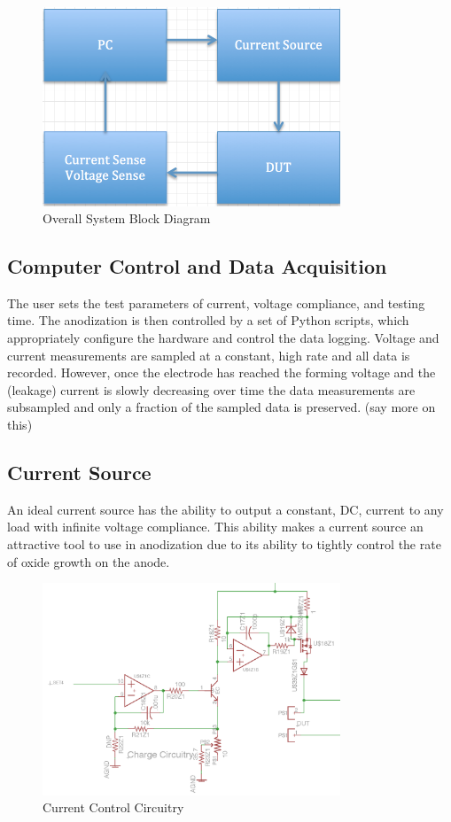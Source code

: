 \documentclass[journal]{IEEEtran}
\begin{document}
\begin{figure}[here]
\centering
\includegraphics[width=3.5in]{blockDiagram}
\caption{Overall System Block Diagram}
\label{fig:blockDiagram}
\end{figure}

\subsection{Computer Control and Data Acquisition}

The user sets the test parameters of current, voltage compliance, and testing time. The anodization is then controlled by a set of Python scripts, which appropriately configure the hardware and control the data logging. Voltage and current measurements are sampled at a constant, high rate and all data is recorded. However, once the electrode has reached the forming voltage and the (leakage) current is slowly decreasing over time the data measurements are subsampled and only a fraction of the sampled data is preserved.  (say more on this)

\subsection{Current Source}

An ideal current source has the ability to output a constant, DC, current to any load with infinite voltage compliance. This ability makes a current source an attractive tool to use in anodization due to its ability to tightly control the rate of oxide growth on the anode.

\begin{figure}[here]
\centering
\includegraphics[width=3.5in]{currentMirror}
\caption{Current Control Circuitry}
\label{fig:currentMirror}
\end{figure}
\end{document}
